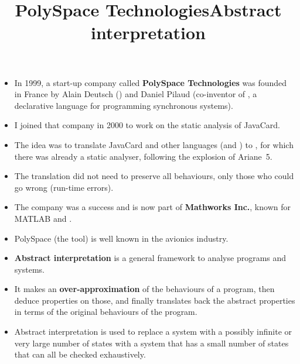 \documentclass[wide]{slides}
\begin{document}
\begin{slide}
  \title{PolySpace Technologies}

  \begin{itemize}

    \item In 1999, a start-up company called \textbf{PolySpace
      Technologies} was founded in France by Alain Deutsch (\Inria)
      and Daniel Pilaud (co\hyp{}inventor of \Lustre, a declarative
      language for programming synchronous systems).

    \item I joined that company in 2000 to work on the static analysis
      of JavaCard.

    \item The idea was to translate JavaCard and other languages
      (\Clang and \Cpp) to \Ada, for which there was already a static
      analyser, following the explosion of Ariane~5.

    \item The translation did not need to preserve all behaviours,
      only those who could go wrong (run\hyp{}time errors).

    \item The company was a success and is now part of
      \textbf{Mathworks Inc.}, known for MATLAB and \Simulink.

    \item PolySpace (the tool) is well known in the avionics industry.

  \end{itemize}

\end{slide}

\begin{slide}
  \title{Abstract interpretation}

  \begin{itemize}

    \item \textbf{Abstract interpretation} is a general framework to
      analyse programs and systems.

    \item It makes an \textbf{over\hyp{}approximation} of the
      behaviours of a program, then deduce properties on those, and
      finally translates back the abstract properties in terms of the
      original behaviours of the program.

    \item Abstract interpretation is used to replace a system with a
      possibly infinite or very large number of states with a system
      that has a small number of states that can all be checked
      exhaustively.

  \end{itemize}

\end{slide}
\end{document}
